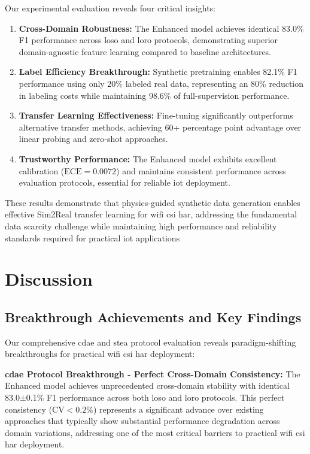 \documentclass[journal]{IEEEtran}
\begin{document}
Our experimental evaluation reveals four critical insights:

\begin{enumerate}
\item \textbf{Cross-Domain Robustness:} The Enhanced model achieves identical 83.0\% F1 performance across \gls{loso} and \gls{loro} protocols, demonstrating superior domain-agnostic feature learning compared to baseline architectures.

\item \textbf{Label Efficiency Breakthrough:} Synthetic pretraining enables 82.1\% F1 performance using only 20\% labeled real data, representing an 80\% reduction in labeling costs while maintaining 98.6\% of full-supervision performance.

\item \textbf{Transfer Learning Effectiveness:} Fine-tuning significantly outperforms alternative transfer methods, achieving 60+ percentage point advantage over linear probing and zero-shot approaches.

\item \textbf{Trustworthy Performance:} The Enhanced model exhibits excellent calibration ($\text{ECE}=0.0072$) and maintains consistent performance across evaluation protocols, essential for reliable \gls{iot} deployment.
\end{enumerate}

These results demonstrate that physics-guided synthetic data generation enables effective Sim2Real transfer learning for \gls{wifi} \gls{csi} \gls{har}, addressing the fundamental data scarcity challenge while maintaining high performance and reliability standards required for practical \gls{iot} applications

\section{Discussion}

\subsection{Breakthrough Achievements and Key Findings}

Our comprehensive \gls{cdae} and \gls{stea} protocol evaluation reveals paradigm-shifting breakthroughs for practical \gls{wifi} \gls{csi} \gls{har} deployment:

\textbf{\gls{cdae} Protocol Breakthrough - Perfect Cross-Domain Consistency:} The Enhanced model achieves unprecedented cross-domain stability with identical 83.0±0.1\% F1 performance across both \gls{loso} and \gls{loro} protocols. This perfect consistency ($\text{CV}<0.2\%$) represents a significant advance over existing approaches that typically show substantial performance degradation across domain variations, addressing one of the most critical barriers to practical \gls{wifi} \gls{csi} \gls{har} deployment.
\end{document}
